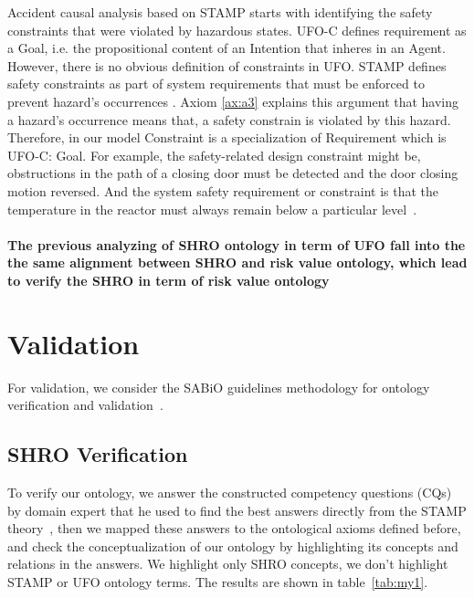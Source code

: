 \documentclass[sw]{iosart2x}
\newcommand{\sabio}[0]{SABiO}
\newcommand{\term}[1]{\textnormal{\textsf{#1}}}
\begin{document}
Accident causal analysis based on STAMP starts with identifying the safety constraints that were violated by hazardous states. \term{UFO-C} \cite{Guizzardi2010a} defines requirement as a Goal, i.e. the propositional content of an Intention that inheres in an Agent. However, there is no obvious definition of constraints in UFO. STAMP defines safety constraints as part of system requirements that must be enforced to prevent hazard's occurrences \cite{leveson2012engineering}. Axiom \ref{ax:a3} explains this argument that having a hazard's occurrence means that, a safety constrain is violated by this hazard. Therefore, in our model \term{Constraint} is a specialization of \term{Requirement} which is \term{UFO-C: Goal}. For example, 
the safety-related design constraint might be, obstructions in the path of a closing door must be detected and the door closing motion reversed. And the system safety requirement or constraint is that the temperature in the reactor must always remain below a particular level~\cite{leveson2012engineering}.
\paragraph{The previous analyzing of SHRO ontology in term of UFO fall into the the same alignment between SHRO and risk value ontology, which lead to verify the SHRO in term of risk value ontology}

\section{Validation}
For validation, we consider the \sabio{} guidelines methodology for ontology verification and validation~\cite{DeAlmeidaFalbo2014}.
\subsection{SHRO Verification}
To verify our ontology, we answer the constructed competency questions \term{(CQs)} by domain expert that he used to find the best answers directly from the STAMP theory~\cite{leveson2012engineering}, then we mapped these answers to the ontological axioms defined before, and check the conceptualization of our ontology by highlighting its concepts and relations in the answers. We highlight only SHRO concepts, we don't highlight STAMP or UFO ontology terms. The results are shown in table~\ref{tab:my1}.
\end{document}
